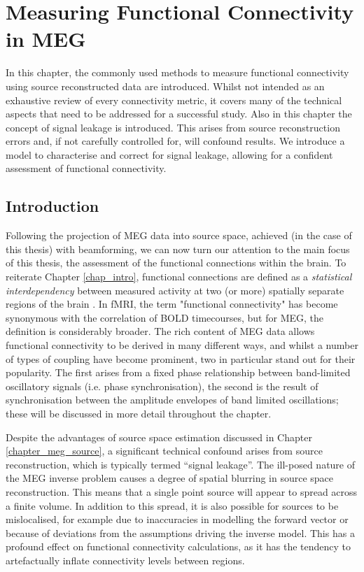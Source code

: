 \chapter{Measuring Functional Connectivity in MEG}\label{chapter_fc_and_leakage}

In this chapter, the commonly used methods to measure functional connectivity using source reconstructed data are introduced. Whilst not intended as an exhaustive review of every connectivity metric, it covers many of the technical aspects that need to be addressed for a successful study. Also in this chapter the concept of signal leakage is introduced. This arises from source reconstruction errors and, if not carefully controlled for, will confound results. We introduce a model to characterise and correct for signal leakage, allowing for a confident assessment of functional connectivity. 

\doublespacing

\section*{Introduction}
Following the projection of MEG data into source space, achieved (in the case of this thesis) with beamforming, we can now turn our attention to the main focus of this thesis, the assessment of the functional connections within the brain. To reiterate Chapter \ref{chap_intro}, functional connections are defined as a \textit{statistical interdependency} between measured activity at two (or more) spatially separate regions of the brain \citep{Friston2011}. In fMRI, the term "functional connectivity" has become synonymous with the correlation of BOLD timecourses, but for MEG, the definition is considerably broader. The rich content of MEG data allows functional connectivity to be derived in many different ways, and whilst a number of types of coupling have become prominent, two in particular stand out for their popularity. The first arises from a fixed phase relationship between band-limited oscillatory signals (i.e. phase synchronisation), the second is the result of synchronisation between the amplitude envelopes of band limited oscillations; these will be discussed in more detail throughout the chapter.

Despite the advantages of source space estimation discussed in Chapter \ref{chapter_meg_source}, a significant technical confound arises from source reconstruction, which is typically termed “signal leakage”. The ill-posed nature of the MEG inverse problem \citep{Hadamard1902} causes a degree of spatial blurring in source space reconstruction. This means that a single point source will appear to spread across a finite volume. In addition to this spread, it is also possible for sources to be mislocalised, for example due to inaccuracies in modelling the forward vector or because of deviations from the assumptions driving the inverse model. This has a profound effect on functional connectivity calculations, as it has the tendency to artefactually inflate connectivity levels between regions. 

